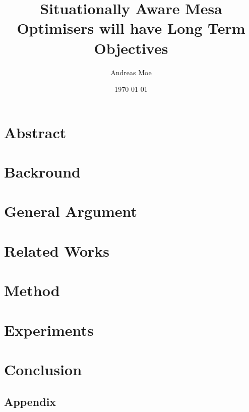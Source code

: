 \documentclass[11pt]{article}
\title{Situationally Aware Mesa Optimisers will have Long Term Objectives}
\author{Andreas Moe}
\date{\today}
\begin{document}
\maketitle

\section*{Abstract}

\section{Backround}\label{sec:backround}



\section{General Argument}\label{sec:generalargument}



\section{Related Works}\label{sec:relatedworks}

\section{Method}\label{sec:method}

\section{Experiments}\label{sec:experiments}

\section{Conclusion}\label{sec:conclusion}



\begin{appendix}
    \section*{Appendix}
\end{appendix}
\end{document}
